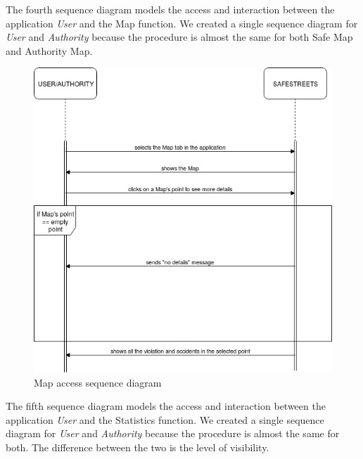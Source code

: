 \documentclass {article}
\begin{document}
		\pagebreak
		\noindent
		The fourth sequence diagram models the access and interaction between the application {\it User} and the Map function. We created a single sequence diagram for {\it User} and {\it Authority} because the procedure is almost the same for both Safe Map and Authority Map.
		\begin{figure}[H]
			\centering
			\includegraphics[scale=0.55]{Images/Diagrams/57SeqDiagram.png}
			\caption{Map access sequence diagram}
		\end{figure}
		\pagebreak
		\noindent
		The fifth sequence diagram models the access and interaction between the application {\it User} and the Statistics function. We created a single sequence diagram for  {\it User} and {\it Authority} because the procedure is almost the same for both. The difference between the two is the level of visibility.
\end{document}
